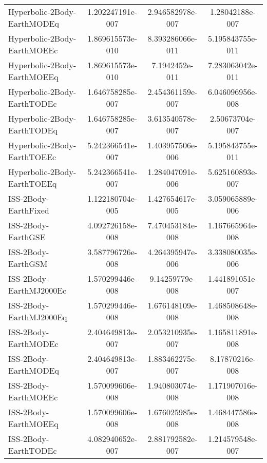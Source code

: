 \begin{table}[htbp!]
\begin{tabular}{lccc}
         Hyperbolic-2Body-EarthMODEq & 1.202247191e-007 & 2.946582978e-007 & 1.28042188e-007 \\
         Hyperbolic-2Body-EarthMOEEc & 1.869615573e-010 & 8.393286066e-011 & 5.195843755e-011 \\
         Hyperbolic-2Body-EarthMOEEq & 1.869615573e-010 & 7.1942452e-011 & 7.283063042e-011 \\
         Hyperbolic-2Body-EarthTODEc & 1.646758285e-007 & 2.454361159e-007 & 6.046096956e-008 \\
         Hyperbolic-2Body-EarthTODEq & 1.646758285e-007 & 3.613540578e-007 & 2.50673704e-007 \\
         Hyperbolic-2Body-EarthTOEEc & 5.242366541e-007 & 1.403957506e-006 & 5.195843755e-011 \\
         Hyperbolic-2Body-EarthTOEEq & 5.242366541e-007 & 1.284047091e-006 & 5.625160893e-007 \\
         ISS-2Body-EarthFixed & 1.122180704e-005 & 1.427654617e-005 & 3.059065889e-006 \\
         ISS-2Body-EarthGSE & 4.092726158e-008 & 7.470453184e-008 & 1.167665964e-008 \\
         ISS-2Body-EarthGSM & 3.587796726e-008 & 4.264395947e-006 & 3.338080035e-006 \\
         ISS-2Body-EarthMJ2000Ec & 1.570299446e-008 & 9.14259779e-008 & 1.441891051e-007 \\
         ISS-2Body-EarthMJ2000Eq & 1.570299446e-008 & 1.676148109e-008 & 1.468508648e-008 \\
         ISS-2Body-EarthMODEc & 2.404649813e-007 & 2.053210935e-007 & 1.165811891e-008 \\
         ISS-2Body-EarthMODEq & 2.404649813e-007 & 1.883462275e-007 & 8.17870216e-008 \\
         ISS-2Body-EarthMOEEc & 1.570099606e-008 & 1.940803074e-008 & 1.171907016e-008 \\
         ISS-2Body-EarthMOEEq & 1.570099606e-008 & 1.676025985e-008 & 1.468447586e-008 \\
         ISS-2Body-EarthTODEc & 4.082940652e-007 & 2.881792582e-007 & 1.214579548e-007 \\

\end{tabular}
\end{table}
